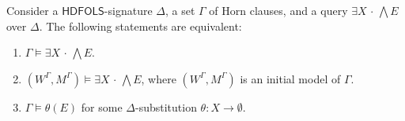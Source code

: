 \documentclass[a4paper,UKenglish,cleveref, autoref]{lipics-v2019}
\newcommand{\HDFOLS}{{\mathsf{HDFOLS}}}
\renewcommand{\models}{\vDash}
\newcommand{\bigand}{\bigwedge}
\newcommand{\Exists}[1]{\exists #1\,{\cdot}\,}
\begin{document}
\begin{theorem} 
  \label{theorem:herbrand}
  Consider a \(\HDFOLS\)-signature \(\Delta\), a set\/ \(\Gamma\) of Horn clauses, and a query \(\Exists{X} \bigand E\) over \(\Delta\).
  The following statements are equivalent:
  \begin{enumerate}
  \item \label{LP1} \(\Gamma \models \Exists{X} \bigand E\).

  \item \label{LP2} \((W^{\Gamma}, M^{\Gamma}) \models \Exists{X} \bigand E\), where \((W^{\Gamma}, M^{\Gamma})\) is an initial model of\/ \(\Gamma\).

  \item \label{LP3} \(\Gamma \models \theta(E)\) for some \(\Delta\)-substitution \(\theta \colon X \to \emptyset\).
  \end{enumerate}
\end{theorem}
\end{document}
